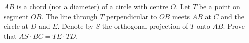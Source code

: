 \documentclass[varwidth]{standalone}
\begin{document}
    $AB$ is a chord (not a diameter) of a circle with centre $O$. Let $T$ be a point on segment $OB$. The line through $T$ perpendicular to $OB$ meets $AB$ at $C$ and the circle at $D$ and $E$. Denote by $S$ the orthogonal projection of $T$ onto $AB$. Prove that $AS \cdot BC = TE \cdot TD$.
\end{document}
